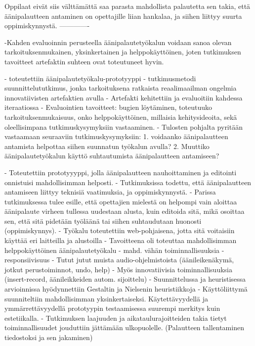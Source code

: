 \documentclass[utf8]{gradu3}
\begin{document}
 Oppilaat eivät siis välttämättä saa parasta mahdollista palautetta sen takia, että äänipalautteen antaminen on opettajille liian hankalaa, ja siihen liittyy suurta oppimiskynnystä.
-------------

-Kahden evaluoinnin perusteella äänipalautetyökalun voidaan sanoa olevan tarkoituksenmukainen, yksinkertainen ja helppokäyttöinen, joten tutkimuksen tavoitteet artefaktin suhteen ovat toteutuneet hyvin.

- toteutettiin äänipalautetyökalu-prototyyppi
- tutkimusmetodi suunnittelututkimus, jonka tarkoituksena ratkaista reaalimaailman ongelmia innovatiivisten artefaktien avulla
- Artefakti kehitettiin ja evaluoitiin kahdessa iteraatiossa
- Evaluointien tavoitteet: bugien löytäminen, toteutuuko tarkoituksenmukaisuus, onko helppokäyttöinen, millaisia kehitysideoita, sekä oleellisimpana tutkimuskysymyksiin vastaaminen.
- Tulosten pohjalta pyritään vastaamaan seuraaviin tutkimuskysymyksiin: 1. voidaanko äänipalautteen antamista helpottaa siihen suunnatun työkalun avulla? 2. Muuttiko äänipalautetyökalun käyttö suhtautumista äänipalautteen antamiseen?

- Toteutettiin prototyyyppi, jolla äänipalautteen nauhoittaminen ja editointi onnistuisi mahdollisimman helposti.
- Tutkimuksissa todettu, että äänipalautteen antamiseen liittyy teknisiä vaatimuksia, ja oppimiskynnystä.
- Parissa tutkimuksessa tulee esille, että opettajien mielestä on helpompi vain aloittaa äänipalaute virheen tullessa uudestaan alusta, kuin editoida sitä, mikä osoittaa sen, että sitä pidetään työläänä tai siihen suhtaudutaan huonosti (oppimiskynnys).
- Työkalu toteutettiin web-pohjaisena, jotta sitä voitaisiin käyttää eri laitteilla ja alustoilla
- Tavoitteena oli toteuttaa mahdollisimman helppokäyttöinen äänipalautetyökalu
	- mahd. vähän toiminnallisuuksia
	- responsiivisuus
	- Tutut jutut muista audio-ohjelmistoista (äänileikenäkymä, jotkut perustoiminnot, undo, help)
	- Myös innovatiivisia toiminnallisuuksia (insert-record, äänileikkeiden autom. sijoittelu)
- Suunnittelussa ja heuristisessa arvioinnissa hyödynnettiin Gestaltin ja Nielsenin heuristiikkoja
- Käyttöliittymä suunniteltiin mahdollisimman yksinkertaiseksi. Käytettävyydellä ja ymmärrettävyydellä prototyypin testaamisessa suurempi merkitys kuin estetiikalla.
- Tutkimuksen laajuuden ja aikataulurajoitteiden takia tietyt toiminnallisuudet jouduttiin jättämään ulkopuolelle. (Palautteen tallentaminen tiedostoksi ja sen jakaminen)
\end{document}
